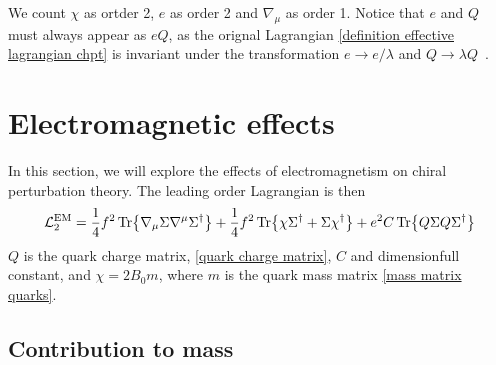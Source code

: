%
We count $\chi$ as ortder 2, $e$ as order 2 and $\nabla_\mu$ as order 1.
Notice that $e$ and $Q$ must always appear as $e Q$, as the orignal Lagrangian \autoref{definition effective lagrangian chpt} is invariant under the transformation $e \rightarrow e/\lambda$ and $Q \rightarrow \lambda Q$~\autocite{pencoIntroductionEffectiveField2020}.



\section{Electromagnetic effects}

In this section, we will explore the effects of electromagnetism on chiral perturbation theory.
The leading order Lagrangian is then~\autocite{eckerRoleResonancesChiral1989,urechVirtualPhotonsChiral1995}
%
\begin{equation}
    \label{leading order lagrangian EM}
    \mathcal{L}_2^{\text{EM}}
    = 
    \frac{1}{4}f^2 
    \Tr{
        \nabla_\mu \Sigma \nabla^\mu \Sigma^\dagger
    }
    +
    \frac{1}{4}f^2 
    \Tr{
        \chi \Sigma^\dagger + \Sigma\chi^\dagger
    }
    +
    e^2 C
    \Tr{Q \Sigma Q \Sigma^\dagger}
\end{equation}
%
$Q$ is the quark charge matrix, \autoref{quark charge matrix}, $C$ and dimensionfull constant, and $\chi = 2B_0 m$, where $m$ is the quark mass matrix \autoref{mass matrix quarks}.



\subsection{Contribution to mass}



